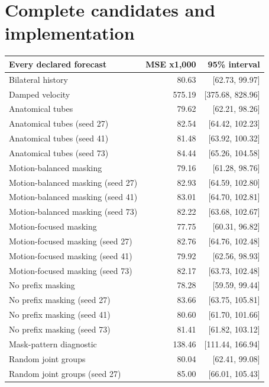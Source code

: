 \documentclass[letterpaper]{article}
\begin{document}


\clearpage

\appendix

\section{Complete candidates and implementation}

\begin{table}[t]
\centering
\footnotesize
\begin{tabular}{lrr}
\toprule
Every declared forecast & MSE x1,000 & 95\% interval \\
\midrule
Bilateral history & 80.63 & [62.73, 99.97] \\
Damped velocity & 575.19 & [375.68, 828.96] \\
Anatomical tubes & 79.62 & [62.21, 98.26] \\
Anatomical tubes (seed 27) & 82.54 & [64.42, 102.23] \\
Anatomical tubes (seed 41) & 81.48 & [63.92, 100.32] \\
Anatomical tubes (seed 73) & 84.44 & [65.26, 104.58] \\
Motion-balanced masking & 79.16 & [61.28, 98.76] \\
Motion-balanced masking (seed 27) & 82.93 & [64.59, 102.80] \\
Motion-balanced masking (seed 41) & 83.01 & [64.70, 102.81] \\
Motion-balanced masking (seed 73) & 82.22 & [63.68, 102.67] \\
Motion-focused masking & 77.75 & [60.31, 96.82] \\
Motion-focused masking (seed 27) & 82.76 & [64.76, 102.48] \\
Motion-focused masking (seed 41) & 79.92 & [62.56, 98.93] \\
Motion-focused masking (seed 73) & 82.17 & [63.73, 102.48] \\
No prefix masking & 78.28 & [59.59, 99.44] \\
No prefix masking (seed 27) & 83.66 & [63.75, 105.81] \\
No prefix masking (seed 41) & 80.60 & [61.70, 101.66] \\
No prefix masking (seed 73) & 81.41 & [61.82, 103.12] \\
Mask-pattern diagnostic & 138.46 & [111.44, 166.94] \\
Random joint groups & 80.04 & [62.41, 99.08] \\
Random joint groups (seed 27) & 85.00 & [66.01, 105.43] \\

\end{tabular}
\end{table}
\end{document}
